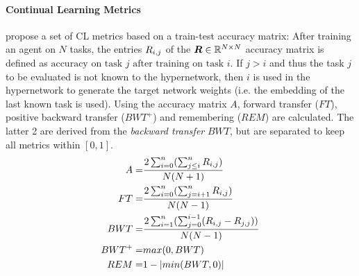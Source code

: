 \documentclass[dvipsnames]{article} %
\newcommand{\comment}[1]{}
\newcommand{\ps}[1] {\comment{{\color {purple} PS: #1}}}             %
\newcommand{\sa}[1] {\comment{{\color{cyan} SA: #1}}}                %
\begin{document}
\paragraph{Continual Learning Metrics} \citet{moreThanForgetting} propose a set of CL metrics based on a train-test accuracy matrix: After training an agent on $N$ tasks, the entries  ${R}_{i,j}$ of the ${\bm{R}}\in \mathbb{R}^{N\times N}$ accuracy matrix is defined as $\text{accuracy on task }j\text{ after training on task }i$. If $j>i$ and thus the task $j$ to be evaluated is not known to the hypernetwork, then $i$ is used in the hypernetwork to generate the target network weights (i.e. the embedding of the last known task is used). 
Using the accuracy matrix $A$, forward transfer ($FT$), positive backward transfer ($BWT^+$) and remembering ($REM$) are calculated. The latter 2 are derived from the \textit{backward transfer} $BWT$, but are separated to keep all metrics within $[0,1]$.
\begin{align}
    A =     & \frac{2\sum_{i=0}^n(\sum_{j\leq i}^n{R}_{i,j})}{N(N+1)} \label{eq:accuracy}\\
    FT =    & \frac{2\sum_{i=0}^n(\sum_{j=i+1}^n{R}_{i,j})}{N(N-1)} \label{eq:FT}\\
    BWT =   & \frac{2\sum_{i=1}^n(\sum_{j=0}^{i-1}({R}_{i,j}-{R}_{j,j}))}{N(N-1)} \label{eq:BTW}\\
    BWT^+ = & max(0, BWT) \label{eq:BWT+}\\
    REM =   & 1-|min(BWT,0)| \label{eq:REM}
\end{align}

\ps{Will not report the TFT metric, getting too long. \paragraph{Training Forward Transfer} The CL metrics based on the train-test accuracy matrix only represent the result at the end of an agent's training on a given task. To get insight into the agents' behavior during training time, we also report the forward transfer metric proposed by \citet{continualWorld}. This metric compares the areas under the curve (AUC) for the training curves of the CL method ($\text{AUC}^{cl}$) with a baseline method ($\text{AUC}^{ref}$) for each task $i$. Intuitively, positive forward transfer here indicates faster learning compared to the baseline, while negative forward transfer indicates slowdown and/or a lower final accuracy. To differentiate this metric from the forward transfer derived from the train-test accuracy matrix (Eq. \ref{eq:FT}), we will hereafter refer to it as "training forward transfer" (TFT).
\sa{Introduce an abbreviation for this, such as TFT.}
\begin{align}
    TFT = \frac{1}{n}\sum_{i=0}^n \frac{\text{AUC}_i^{cl}-\text{AUC}_i^{ref}}{1-\text{AUC}_i^{ref}} \label{eq:TFT}
\end{align}
}
\end{document}
